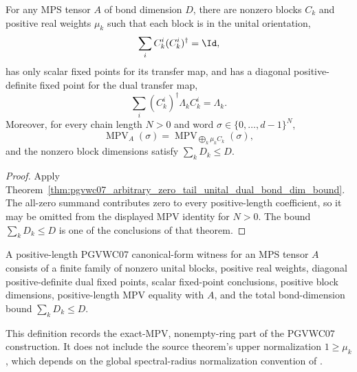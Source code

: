 \begin{theorem}%
    \label{thm:pgvwc07_arbitrary_positive_length_unital_dual_bond_dim_bound}
    \leanok
    For any MPS tensor $A$ of bond dimension $D$, there are nonzero blocks
    $C_k$ and positive real weights $\mu_k$ such that each block is in the
    unital orientation,
    \[
        \sum_i C_k^i(C_k^i)^\dagger=\Id,
    \]
    has only scalar fixed points for its transfer map, and has a diagonal
    positive-definite fixed point for the dual transfer map,
    \[
        \sum_i (C_k^i)^\dagger\Lambda_k C_k^i=\Lambda_k.
    \]
    Moreover, for
    every chain length $N>0$ and word
    $\sigma\in\{0,\ldots,d-1\}^N$,
    \[
        \operatorname{MPV}_A(\sigma)
        =
        \operatorname{MPV}_{\bigoplus_k \mu_k C_k}(\sigma),
    \]
    and the nonzero block dimensions satisfy $\sum_k D_k\leq D$.
\end{theorem}
\begin{proof}\leanok
    Apply Theorem~\ref{thm:pgvwc07_arbitrary_zero_tail_unital_dual_bond_dim_bound}.
    The all-zero summand contributes zero to every positive-length coefficient,
    so it may be omitted from the displayed MPV identity for $N>0$. The
    bound $\sum_k D_k\leq D$ is one of the conclusions of that theorem.
\end{proof}

\begin{definition}%
    \label{def:pgvwc07_positive_length_witness}
    \leanok
    A positive-length PGVWC07 canonical-form witness for an MPS tensor $A$
    consists of a finite family of nonzero unital blocks, positive real
    weights, diagonal positive-definite dual fixed points, scalar fixed-point
    conclusions, positive block dimensions, positive-length MPV equality with
    $A$, and the total bond-dimension bound $\sum_k D_k\leq D$.

    This definition records the exact-MPV, nonempty-ring part of the PGVWC07
    construction. It does not include the source theorem's upper normalization
    $1\geq\mu_k$, which depends on the global spectral-radius normalization
    convention of \cite[Theorem~Th:TIcanonical]{PerezGarcia2007Matrix}.
\end{definition}

